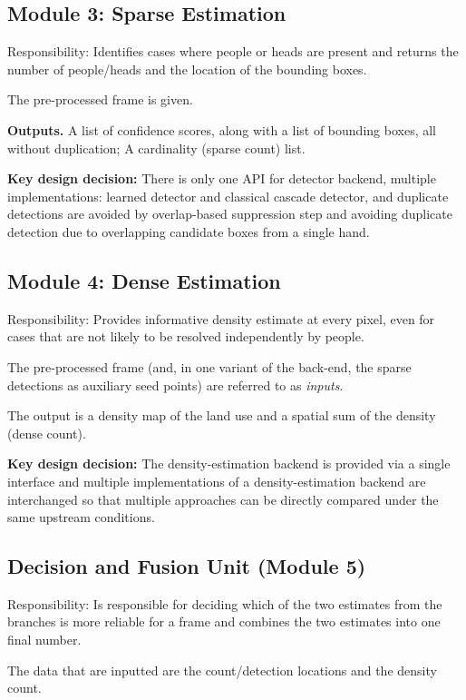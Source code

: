 \subsection{Module 3: Sparse Estimation}

Responsibility: Identifies cases where people or heads are present and returns the number of people/heads and the location of the bounding boxes.

The pre-processed frame is given.

\textbf{Outputs.} A list of confidence scores, along with a list of bounding boxes, all without duplication; A cardinality (sparse count) list.

\textbf{Key design decision:} There is only one API for detector backend, multiple implementations: learned detector and classical cascade detector, and duplicate detections are avoided by overlap-based suppression step and avoiding duplicate detection due to overlapping candidate boxes from a single hand.

\subsection{Module 4: Dense Estimation}

Responsibility: Provides informative density estimate at every pixel, even for cases that are not likely to be resolved independently by people.

The pre-processed frame (and, in one variant of the back-end, the sparse detections as auxiliary seed points) are referred to as \emph{inputs}.

The output is a density map of the land use and a spatial sum of the density (dense count).

\textbf{Key design decision:} The density-estimation backend is provided via a single interface and multiple implementations of a density-estimation backend are interchanged so that multiple approaches can be directly compared under the same upstream conditions.

\subsection{Decision and Fusion Unit (Module 5)}

Responsibility: Is responsible for deciding which of the two estimates from the branches is more reliable for a frame and combines the two estimates into one final number.

The data that are inputted are the count/detection locations and the density count.

